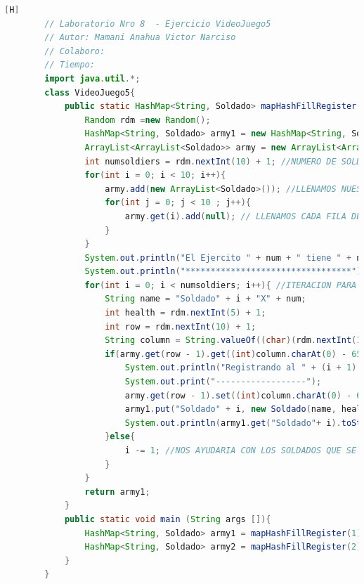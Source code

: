 \documentclass{article}
\begin{document}
	\begin{lstlisting}[language=java,caption={Las lineas de codigos del metodo creado:}][H]
		// Laboratorio Nro 8  - Ejercicio VideoJuego5
		// Autor: Mamani Anahua Victor Narciso
		// Colaboro:
		// Tiempo:
		import java.util.*;
		class VideoJuego5{
			public static HashMap<String, Soldado> mapHashFillRegister(int num){
				Random rdm =new Random();
				HashMap<String, Soldado> army1 = new HashMap<String, Soldado>();
				ArrayList<ArrayList<Soldado>> army = new ArrayList<ArrayList<Soldado>>(); //NOS AYUDARIAMOS DE UN ARRAYLIST PARA PODER AYUDARNOS CON EL USO DE HASHMAPS PARA PODER REGISTAR A SOLDADOS EN LA QUE NINGUNO DE ESTOS SE REPITA 
				int numsoldiers = rdm.nextInt(10) + 1; //NUMERO DE SOLDADOS QUE SE VAN A CREAR DE 1 AL 10 
				for(int i = 0; i < 10; i++){
					army.add(new ArrayList<Soldado>()); //LLENAMOS NUESTROS ARRAYLIST BIDIMENSIONAL CON CADA FILA PARA QUE CUMPLAN CON ESTRUCTURA DEL TABLERO
					for(int j = 0; j < 10 ; j++){
						army.get(i).add(null); // LLENAMOS CADA FILA DEL ARRAYLIST CON UN OBJETO SOLDADO CON TAL QUE ESTE SEA NULL PARA QUE SEPA QUE ESTE TIENE UNA CASILLA PERO NO HAY NADIE TODAVIA SE PUEDE LLENAR 
					}
				}
				System.out.println("El Ejercito " + num + " tiene " + numsoldiers + " soldados : " ); 
				System.out.println("*********************************");
				for(int i = 0; i < numsoldiers; i++){ //ITERACION PARA PODER DARLES LOS DATOS A CADA SOLDADO CREADO 
					String name = "Soldado" + i + "X" + num;
					int health = rdm.nextInt(5) + 1;
					int row = rdm.nextInt(10) + 1;
					String column = String.valueOf((char)(rdm.nextInt(10) + 65)); //REUTILIZAMOS CODIGO DEL ANTERIOR ARCHIVO VIDEOJUEGO4.JAVA YA QUE TENDRIAN LA MISMA FUNCIONALIDAD
					if(army.get(row - 1).get((int)column.charAt(0) - 65) == null){ 
						System.out.println("Registrando al " + (i + 1) + " soldado del Ejercito " + num + "");
						System.out.print("------------------");
						army.get(row - 1).set((int)column.charAt(0) - 65, new Soldado(name, health, row, column));
						army1.put("Soldado" + i, new Soldado(name, health, row, column)); //INTEGRAMOS AL HASHMAP AL SOLDADO CON SU RESPECTIVO NOMBRE Y VALOR 
						System.out.println(army1.get("Soldado"+ i).toString()); //PUBLICAMOS AL SOLDADO CREADO POR ORDEN DE CREACION
					}else{
						i -= 1; //NOS AYUDARIA CON LOS SOLDADOS QUE SE REPITEN EN EL MISMO CASILLERO CON TAL QUE NO DEBERIA CONTAR 
					}
				}
				return army1;
			}
			public static void main (String args []){
				HashMap<String, Soldado> army1 = mapHashFillRegister(1);
				HashMap<String, Soldado> army2 = mapHashFillRegister(2);
			}
		}
	\end{lstlisting}
\end{document}
